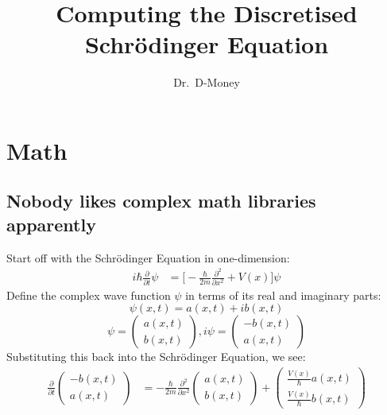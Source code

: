 \documentclass[11pt,letterpaper]{article}
\begin{document}
	\setlength{\parindent}{0pt}
	\setlength{\parskip}{1em}
	\title{Computing the Discretised Schr{\"o}dinger Equation}
	\author{Dr.\ D-Money}
	\maketitle

	\section{Math}
	\subsection{Nobody likes complex math libraries apparently}
	Start off with the Schr{\"o}dinger Equation in one-dimension:
	\begin{align*}
		i \hbar \frac{\partial}{\partial t} \psi &= \Big[-\frac{\hbar}{2m}\frac{\partial^2}{\partial x^2} + V(x)\Big] \psi
	\end{align*}
	Define the complex wave function $\psi$ in terms of its real and imaginary parts:
		\[\psi(x,t) = a(x,t)+ib(x,t)\]
		\[\psi =
		\begin{pmatrix}
			a(x,t) \\
			b(x,t)
		\end{pmatrix},
		i\psi = 
		\begin{pmatrix}
			-b(x,t)\\
			a(x,t)
		\end{pmatrix}\]
	Substituting this back into the Schr{\"o}dinger Equation, we see:
	\begin{align*}
		\frac{\partial}{\partial t} 
		\begin{pmatrix}
			-b(x,t)\\
			a(x,t)
		\end{pmatrix} &= 
		-\frac{\hbar}{2m}\frac{\partial^2}{\partial x^2}
		\begin{pmatrix}
			a(x,t)\\
			b(x,t)
		\end{pmatrix}
		+
		\begin{pmatrix}
			\frac{V(x)}{\hbar} a(x,t)\\
			\frac{V(x)}{\hbar} b(x,t)
		\end{pmatrix}
	\end{align*}
\end{document}
